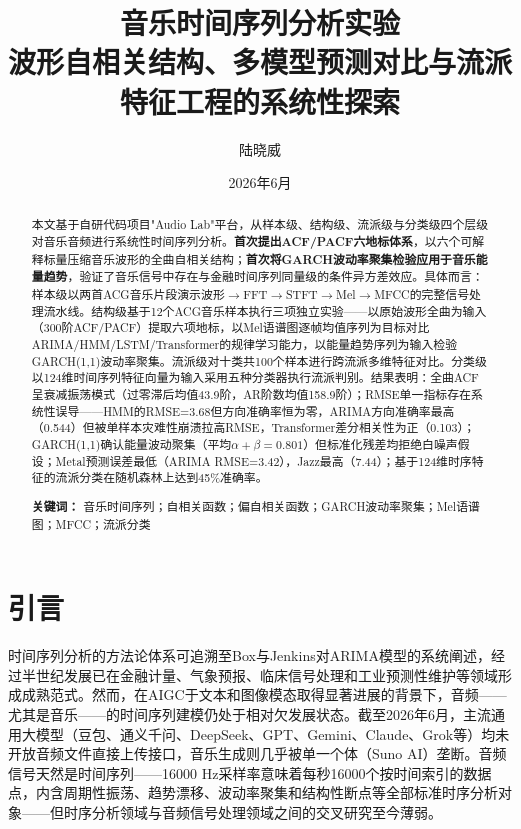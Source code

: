 \documentclass[12pt,a4paper]{article}
\title{\textbf{\huge 音乐时间序列分析实验}\\[8pt]
       \large 波形自相关结构、多模型预测对比与流派特征工程的系统性探索}
\author{陆晓威\quad 2023212547}
\date{2026年6月}
\begin{document}
\maketitle

\begin{abstract}
\noindent 本文基于自研代码项目"Audio Lab"平台，从样本级、结构级、流派级与分类级四个层级对音乐音频进行系统性时间序列分析。\textbf{首次提出ACF/PACF六地标体系}，以六个可解释标量压缩音乐波形的全曲自相关结构；\textbf{首次将GARCH波动率聚集检验应用于音乐能量趋势}，验证了音乐信号中存在与金融时间序列同量级的条件异方差效应。具体而言：样本级以两首ACG音乐片段演示波形$\to$FFT$\to$STFT$\to$Mel$\to$MFCC的完整信号处理流水线。结构级基于12个ACG音乐样本执行三项独立实验——以原始波形全曲为输入（300阶ACF/PACF）提取六项地标，以Mel语谱图逐帧均值序列为目标对比ARIMA/HMM/LSTM/Transformer的规律学习能力，以能量趋势序列为输入检验GARCH(1,1)波动率聚集。流派级对十类共100个样本进行跨流派多维特征对比。分类级以124维时间序列特征向量为输入采用五种分类器执行流派判别。结果表明：全曲ACF呈衰减振荡模式（过零滞后均值43.9阶，AR阶数均值158.9阶）；RMSE单一指标存在系统性误导——HMM的RMSE=3.68但方向准确率恒为零，ARIMA方向准确率最高（0.544）但被单样本灾难性崩溃拉高RMSE，Transformer差分相关性为正（0.103）；GARCH(1,1)确认能量波动聚集（平均$\alpha+\beta=0.801$）但标准化残差均拒绝白噪声假设；Metal预测误差最低（ARIMA RMSE=3.42），Jazz最高（7.44）；基于124维时序特征的流派分类在随机森林上达到45\%准确率。

\vspace{6pt}
\noindent\textbf{关键词：} 音乐时间序列；自相关函数；偏自相关函数；GARCH波动率聚集；Mel语谱图；MFCC；流派分类
\end{abstract}

\newpage
\tableofcontents
\newpage

\section{引言}

时间序列分析的方法论体系可追溯至Box与Jenkins对ARIMA模型的系统阐述\cite{box2015}，经过半世纪发展已在金融计量\cite{bollerslev1986}、气象预报、临床信号处理\cite{richman2000}和工业预测性维护等领域形成成熟范式。然而，在AIGC于文本和图像模态取得显著进展的背景下，音频——尤其是音乐——的时间序列建模仍处于相对欠发展状态。截至2026年6月，主流通用大模型（豆包、通义千问、DeepSeek、GPT、Gemini、Claude、Grok等）均未开放音频文件直接上传接口，音乐生成则几乎被单一个体（Suno AI）垄断。音频信号天然是时间序列——16000 Hz采样率意味着每秒16000个按时间索引的数据点，内含周期性振荡、趋势漂移、波动率聚集和结构性断点等全部标准时序分析对象——但时序分析领域与音频信号处理领域之间的交叉研究至今薄弱。
\end{document}
